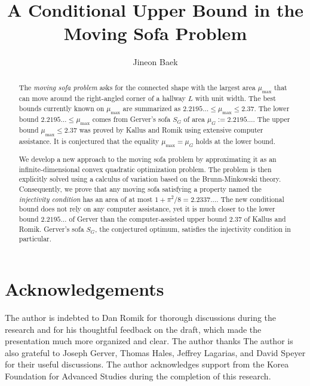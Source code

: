 \documentclass[10pt]{article}
\title{A Conditional Upper Bound in the Moving Sofa Problem}
\author{Jineon Baek}
\theoremstyle{plain}
\theoremstyle{definition}
\theoremstyle{remark}
\begin{document}
\maketitle

\begin{abstract}
The \emph{moving sofa problem} asks for the connected shape with the largest area $\mu_{\text{max}}$ that can move around the right-angled corner of a hallway $L$ with unit width. The best bounds currently known on $\mu_{\max}$ are summarized as $2.2195\ldots \leq \mu_{\max} \leq 2.37$. The lower bound $2.2195\ldots \leq \mu_{\max}$ comes from Gerver's sofa $S_G$ of area $\mu_G := 2.2195\ldots$. The upper bound $\mu_{\max} \leq 2.37$ was proved by Kallus and Romik using extensive computer assistance. It is conjectured that the equality $\mu_{\max} = \mu_G$ holds at the lower bound.

We develop a new approach to the moving sofa problem by approximating it as an infinite-dimensional convex quadratic optimization problem. The problem is then explicitly solved using a calculus of variation based on the Brunn-Minkowski theory. Consequently, we prove that any moving sofa satisfying a property named the \emph{injectivity condition} has an area of at most $1 + \pi^2/8 = 2.2337\dots$. The new conditional bound does not rely on any computer assistance, yet it is much closer to the lower bound $2.2195\ldots$ of Gerver than the computer-assisted upper bound $2.37$ of Kallus and Romik. Gerver's sofa $S_G$, the conjectured optimum, satisfies the injectivity condition in particular.
\end{abstract}

\tableofcontents



\section*{Acknowledgements}

The author is indebted to Dan Romik for thorough discussions during the research and for his thoughtful feedback on the draft, which made the presentation much more organized and clear. The author thanks The author is also grateful to Joseph Gerver, Thomas Hales, Jeffrey Lagarias, and David Speyer for their useful discussions. The author acknowledges support from the Korea Foundation for Advanced Studies during the completion of this research.

\printbibliography
\end{document}
